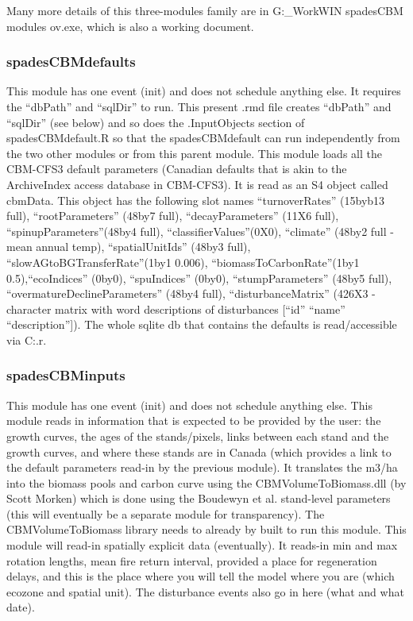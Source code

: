 \documentclass[]{article}
\begin{document}
Many more details of this three-modules family are in
G:\RES\_Work\Work\SpaDES\spadesCBM\Prezi WIN spadesCBM modules ov.exe,
which is also a working document.

\subsubsection{spadesCBMdefaults}\label{spadescbmdefaults}

This module has one event (init) and does not schedule anything else. It
requires the ``dbPath'' and ``sqlDir'' to run. This present .rmd file
creates ``dbPath'' and ``sqlDir'' (see below) and so does the
.InputObjects section of spadesCBMdefault.R so that the spadesCBMdefault
can run independently from the two other modules or from this parent
module. This module loads all the CBM-CFS3 default parameters (Canadian
defaults that is akin to the ArchiveIndex access database in CBM-CFS3).
It is read as an S4 object called cbmData. This object has the following
slot names ``turnoverRates'' (15byb13 full), ``rootParameters'' (48by7
full), ``decayParameters'' (11X6 full), ``spinupParameters''(48by4
full), ``classifierValues''(0X0), ``climate'' (48by2 full - mean annual
temp), ``spatialUnitIds'' (48by3 full), ``slowAGtoBGTransferRate''(1by1
0.006), ``biomassToCarbonRate''(1by1 0.5),``ecoIndices'' (0by0),
``spuIndices'' (0by0), ``stumpParameters'' (48by5 full),
``overmatureDeclineParameters'' (48by4 full), ``disturbanceMatrix''
(426X3 - character matrix with word descriptions of disturbances
{[}``id'' ``name'' ``description''{]}). The whole sqlite db that
contains the defaults is read/accessible via
C:\Celine\GitHub\spadesCBM\exploringCode\readInSQLiteData.r.

\subsubsection{spadesCBMinputs}\label{spadescbminputs}

This module has one event (init) and does not schedule anything else.
This module reads in information that is expected to be provided by the
user: the growth curves, the ages of the stands/pixels, links between
each stand and the growth curves, and where these stands are in Canada
(which provides a link to the default parameters read-in by the previous
module). It translates the m3/ha into the biomass pools and carbon curve
using the CBMVolumeToBiomass.dll (by Scott Morken) which is done using
the Boudewyn et al. stand-level parameters (this will eventually be a
separate module for transparency). The CBMVolumeToBiomass library needs
to already by built to run this module. This module will read-in
spatially explicit data (eventually). It reads-in min and max rotation
lengths, mean fire return interval, provided a place for regeneration
delays, and this is the place where you will tell the model where you
are (which ecozone and spatial unit). The disturbance events also go in
here (what and what date).
\end{document}
